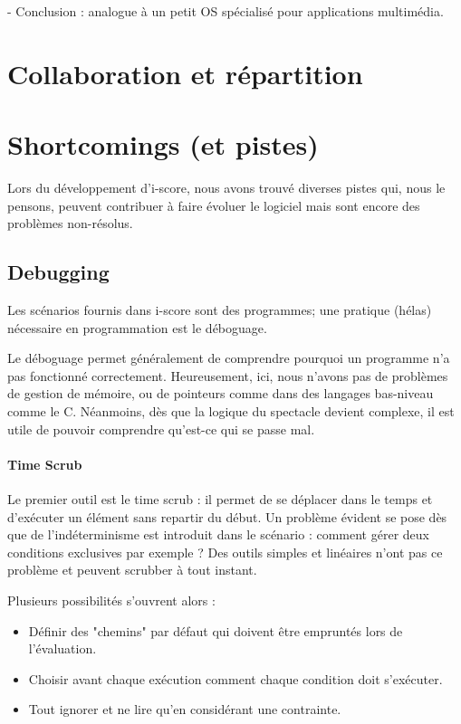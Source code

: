 \documentclass{sigchi}
\begin{document}
- Conclusion : analogue à un petit OS spécialisé pour applications multimédia.

\section{Collaboration et répartition}

\section{Shortcomings (et pistes)}
Lors du développement d'i-score, nous avons trouvé diverses pistes qui, nous le pensons, peuvent contribuer à 
faire évoluer le logiciel mais sont encore des problèmes non-résolus.

\subsection{Debugging}
Les scénarios fournis dans i-score sont des programmes; une pratique (hélas) nécessaire en programmation est le déboguage. 

Le déboguage permet généralement de comprendre pourquoi un programme n'a pas fonctionné correctement. Heureusement, ici, nous n'avons pas de problèmes de gestion de mémoire, ou de pointeurs comme dans des langages  bas-niveau comme le C. Néanmoins, dès que la logique du spectacle devient complexe, il est utile de pouvoir comprendre qu'est-ce qui se passe mal.

\paragraph{Time Scrub}
Le premier outil est le time scrub : il permet de se déplacer dans le temps et d'exécuter un élément sans repartir du début. Un problème évident se pose dès que de l'indéterminisme est introduit dans le scénario : comment gérer deux conditions exclusives par exemple ? Des outils simples et linéaires n'ont pas ce problème et peuvent scrubber à tout instant.

Plusieurs possibilités s'ouvrent alors :
\begin{itemize}
    \item Définir des "chemins" par défaut qui doivent être empruntés lors de l'évaluation.
    \item Choisir avant chaque exécution comment chaque condition doit s'exécuter.
    \item Tout ignorer et ne lire qu'en considérant une contrainte.
\end{itemize}
\end{document}
